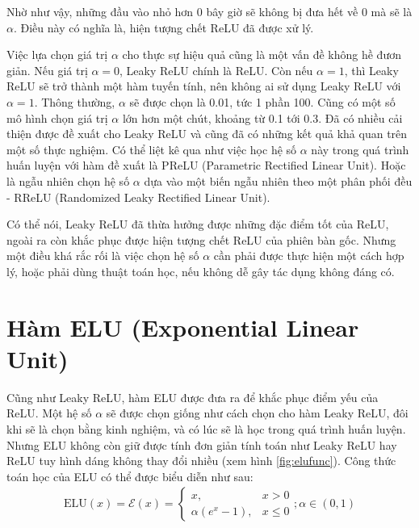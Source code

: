 Nhờ như vậy, những đầu vào nhỏ hơn 0 bây giờ sẽ không bị đưa hết về 0 mà sẽ là $\alpha$.
Điều này có nghĩa là, hiện tượng chết ReLU đã được xử lý.
\vspace{5pt}

Việc lựa chọn giá trị $\alpha$ cho thực sự hiệu quả cũng là một vấn đề không hề đươn giản.
Nếu giá trị $\alpha = 0$, Leaky ReLU chính là ReLU.
Còn nếu $\alpha = 1$, thì Leaky ReLU sẽ trở thành một hàm tuyến tính, nên không ai sử dụng Leaky ReLU với $\alpha = 1$.
Thông thường, $\alpha$ sẽ được chọn là 0.01, tức 1 phần 100.
Cũng có một số mô hình chọn giá trị $\alpha$ lớn hơn một chút, khoảng từ 0.1 tới 0.3.
Đã có nhiều cải thiện được đề xuất cho Leaky ReLU và cũng đã có những kết quả khả quan trên một số thực nghiệm.
Có thể liệt kê qua như việc học hệ số $\alpha$ này trong quá trình huấn luyện với hàm đề xuất là PReLU (Parametric Rectified Linear Unit).
Hoặc là ngẫu nhiên chọn hệ số $\alpha$ dựa vào một biến ngẫu nhiên theo một phân phối đều - RReLU (Randomized Leaky Rectified Linear Unit).
\vspace{5pt}

Có thể nói, Leaky ReLU đã thừa hưởng được những đặc điểm tốt của ReLU, ngoài ra còn khắc phục được hiện tượng chết ReLU của phiên bàn gốc.
Nhưng một điều khá rắc rối là việc chọn hệ số $\alpha$ cần phải được thực hiện một cách hợp lý, hoặc phải dùng thuật toán học, nếu không dễ gây tác dụng không đáng có.

\section{Hàm ELU (Exponential Linear Unit)}\label{sec:hamelu}

Cũng như Leaky ReLU, hàm ELU \cite{clevert2016fast} được đưa ra để khắc phục điểm yếu của ReLU.
Một hệ số $\alpha$ sẽ được chọn giống như cách chọn cho hàm Leaky ReLU, đôi khi sẽ là chọn bằng kinh nghiệm, và có lúc sẽ là học trong quá trình huấn luyện.
Nhưng ELU không còn giữ được tính đơn giản tính toán như Leaky ReLU hay ReLU tuy hình dáng không thay đổi nhiều (xem hình \ref{fig:elufunc}).
Công thức toán học của ELU có thể được biểu diễn như sau:
\begin{align}
    \text{ELU}(x) = \mathcal{E}(x) = \begin{cases}x, &x > 0\\\alpha\left(e^x - 1\right), &x \le 0\end{cases}; \alpha \in \left(0, 1\right)
\end{align}

